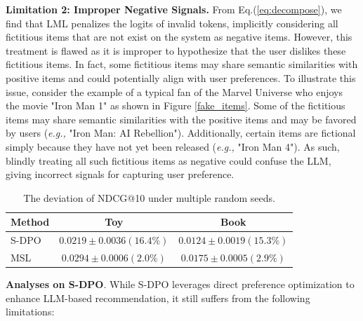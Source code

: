 \documentclass[sigconf,natbib=true]{acmart}
\newcommand{\eg}{\emph{e.g., }}
\begin{document}
\textbf{Limitation 2: Improper Negative Signals.} From Eq.(\ref{eq:decompose}), we find that LML penalizes the logits of invalid tokens, implicitly considering all fictitious items that are not exist on the system as negative items. However, this treatment is flawed as it is improper to hypothesize that the user dislikes these fictitious items. In fact, some fictitious items may share semantic similarities with positive items and could potentially align with user preferences.
To illustrate this issue, consider the example of a typical fan of the Marvel Universe who enjoys the movie "Iron Man 1" as shown in Figure \ref{fake_items}. Some of the fictitious items may share semantic similarities with the positive items and may be favored by users (\eg "Iron Man: AI Rebellion"). Additionally, certain items are fictional simply because they have not yet been released (\eg "Iron Man 4").
As such, blindly treating all such fictitious items as negative could confuse the LLM, giving incorrect signals for capturing user preference.

\begin{table}[]
\centering
\caption{The deviation of NDCG@10 under multiple random seeds.}
\label{tab:deviation}
\begin{tabular}{@{}lcc@{}}
\toprule
Method & Toy                 & Book                 \\ \midrule
S-DPO  & $0.0219 \pm 0.0036 (16.4\%)$ & $0.0124 \pm 0.0019 (15.3\%)$  \\
MSL    & $0.0294 \pm 0.0006 (2.0\%)$ & $ 0.0175 \pm 0.0005 (2.9\%)$ \\ \bottomrule
\end{tabular}
\end{table}


\textbf{Analyses on S-DPO}.
While S-DPO \cite{chen2024softmax} leverages direct preference optimization to enhance LLM-based recommendation, it still suffers from the following limitations:
\end{document}
